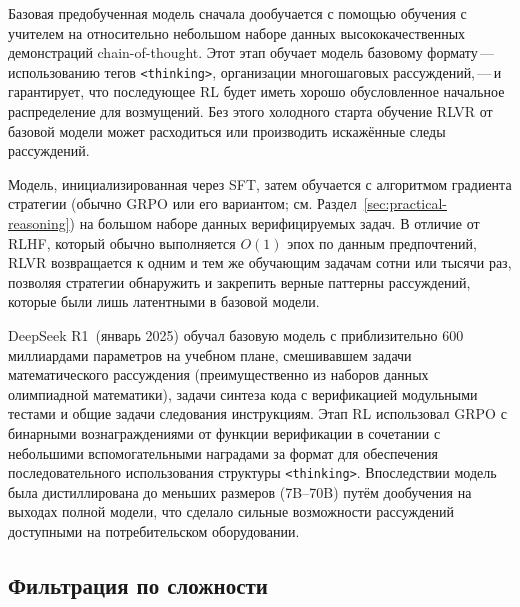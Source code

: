 \begin{description}[leftmargin=!,labelwidth=3.5cm]
\item[Этап~1: Холодный старт SFT] Базовая предобученная модель сначала
  дообучается с помощью обучения с учителем на относительно небольшом наборе данных
  высококачественных демонстраций chain-of-thought. Этот этап обучает модель
  базовому формату\,---\,использованию тегов \texttt{<thinking>},
  организации многошаговых рассуждений,\,---\,и гарантирует, что
  последующее RL будет иметь хорошо обусловленное начальное распределение для возмущений.
  Без этого холодного старта обучение RLVR от базовой модели может расходиться
  или производить искажённые следы рассуждений.

\item[Этап~2: Крупномасштабный RLVR] Модель, инициализированная через SFT, затем
  обучается с алгоритмом градиента стратегии (обычно GRPO или его
  вариантом; см. Раздел~\ref{sec:practical-reasoning}) на большом
  наборе данных верифицируемых задач. В отличие от RLHF, который обычно выполняется
  $O(1)$ эпох по данным предпочтений, RLVR возвращается к одним и тем же
  обучающим задачам сотни или тысячи раз, позволяя
  стратегии обнаружить и закрепить верные паттерны рассуждений, которые были
  лишь латентными в базовой модели.
\end{description}

\begin{example}
\label{ex:deepseek-r1}
DeepSeek R1~(январь 2025) обучал базовую модель с приблизительно
600 миллиардами параметров на учебном плане, смешивавшем задачи математического
рассуждения (преимущественно из наборов данных олимпиадной математики),
задачи синтеза кода с верификацией модульными тестами и общие
задачи следования инструкциям. Этап RL использовал GRPO с бинарными
вознаграждениями от функции верификации в сочетании с небольшими вспомогательными
наградами за формат для обеспечения последовательного использования структуры \texttt{<thinking>}.
Впоследствии модель была дистиллирована до меньших размеров
(7B--70B) путём дообучения на выходах полной модели, что сделало
сильные возможности рассуждений доступными на потребительском оборудовании.
\end{example}

\subsection{Фильтрация по сложности}
\label{subsec:difficulty-filtering}

